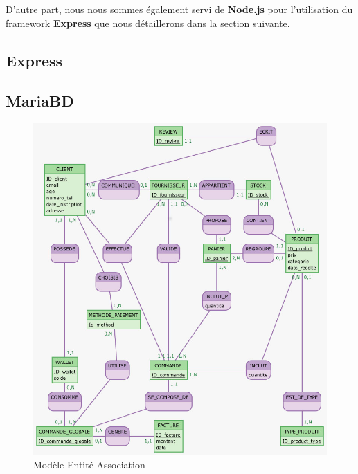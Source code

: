 \documentclass[a4paper,12pt]{report}
\theoremstyle{break}
\theoremstyle{break}
\theoremstyle{break}
\theoremstyle{break}
\theoremstyle{definition}
\theoremstyle{remark}
\begin{document}
D'autre part, nous nous sommes également servi de \textbf{Node.js} pour l'utilisation du framework \textbf{Express} que nous détaillerons dans la section suivante.
\subsection{Express}
\subsection{MariaBD}
\begin{figure}[!ht]
  \centering
  \includegraphics[scale=0.6]{images/Clients.jpg}
  \caption{Modèle Entité-Association}
  \label{fig:modele_EA}
\end{figure}
\end{document}
